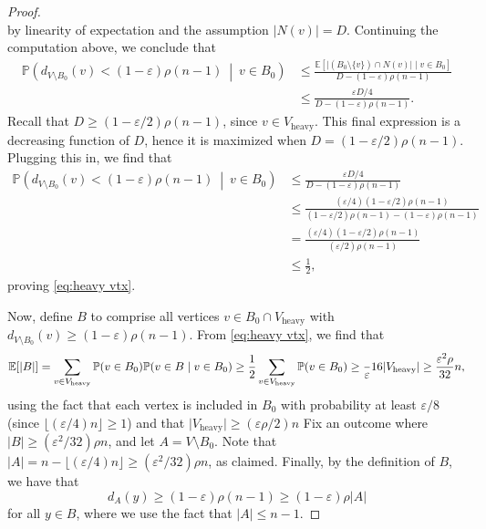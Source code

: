 \documentclass{aic}
\theoremstyle{plain}
\theoremstyle{remark}
\def\E{\mathbb{E}}
\newcommand{\eps}{\ensuremath{\varepsilon}}
\newcommand\ab[1]{\lvert #1 \rvert}
\newcommand\flo[1]{\lfloor #1 \rfloor}
\renewcommand{\P}{\mathbb{P}}
\begin{document}
\begin{proof}
\[    \]
    by linearity of expectation and the assumption $\ab{N(v)}=D$. Continuing the computation above, we conclude that
    \begin{align*}
       \P\left(d_{V\setminus B_0}(v)< (1-\eps)\rho (n-1) ~\middle|~ v\in B_0\right)
        &\leq \frac{\E[\ab{(B_0 \setminus \{v\})\cap N(v)} \mid v \in B_0]}{D-(1-\varepsilon)\rho(n-1)}\\
        &\leq \frac{\eps D/4}{D-(1-\eps)\rho(n-1)}.
    \end{align*}
    Recall that $D \geq (1-\eps/2)\rho(n-1)$, since $v \in V_{\mathrm{heavy}}$.
    This final expression is a decreasing function of $D$, hence it is maximized when $D=(1-\eps/2)\rho(n-1)$. Plugging this in, we find that
    \begin{align*}
       \P\left(d_{V\setminus B_0}(v)< (1-\eps)\rho (n-1) ~\middle|~ v\in B_0\right)
        &\leq \frac{\eps D/4}{D-(1-\eps)\rho(n-1)}\\
        &\leq \frac{(\eps/4)(1-\eps/2)\rho(n-1)}{(1-\eps/2)\rho(n-1)-(1-\eps)\rho(n-1)}\\
        &=\frac{(\eps/4)(1-\eps/2)\rho(n-1)}{(\eps/2)\rho(n-1)}\\
        &\leq \frac 12,
    \end{align*}
    proving \eqref{eq:heavy vtx}.
    
    Now, define $B$ to comprise all vertices $v \in B_0 \cap V_{\mathrm{heavy}}$ with $d_{V \setminus B_0}(v) \geq (1-\eps)\rho (n-1)$. 
    From \eqref{eq:heavy vtx}, we find that
    \[
    \E[\ab B] = \sum_{v \in V_{\mathrm{heavy}}} \P(v \in B_0) \P(v \in B \mid v \in B_0) \geq \frac 12 \sum_{v \in V_{\mathrm{heavy}}} \P(v \in B_0) \geq \frac \eps {16} \ab{V_{\mathrm{heavy}}} \geq \frac{\eps^2\rho}{32}n,
    \]
    using the fact that each vertex is included in $B_0$ with probability at least $\varepsilon/8$ (since $\flo{(\varepsilon/4)n}\geq1$) and that $\ab{V_{\mathrm{heavy}}}\geq (\varepsilon\rho/2)n$
    Fix an outcome where $\ab B \geq (\eps^2/32)\rho n$, and let $A = V \setminus B_0$. Note that $\ab A = n - \flo{(\eps/4)n}\geq (\eps^2/32)\rho n$, as claimed. Finally, by the definition of $B$, we have that
    \[
    d_A(y) \geq (1-\eps)\rho (n-1) \geq (1-\eps)\rho \ab A
    \]
    for all $y \in B$, where we use the fact that $\ab A \leq n-1$.
\end{proof}
\end{document}
